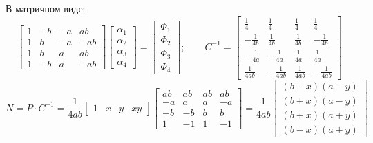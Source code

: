 \documentclass{bmstu}
\begin{document}
		В матричном виде:
		\[
		\begin{bmatrix}
			1 & -b & -a & ab \\
			1 & b & -a &-ab \\
			1 & b & a & ab \\
			1 & -b & a & -ab
		\end{bmatrix}
		\begin{bmatrix}
			\alpha_1 \\ \alpha_2 \\ \alpha_3 \\ \alpha_4 
		\end{bmatrix} = \begin{bmatrix}
		\Phi_1 \\ \Phi_2 \\ \Phi_3 \\ \Phi_4  		
		\end{bmatrix}; \qquad C^{-1}= \begin{bmatrix}
		\frac{1}{4} & \frac{1}{4} & \frac{1}{4} & \frac{1}{4} \\
		-\frac{1}{4b} & \frac{1}{4b} & \frac{1}{4b} & -\frac{1}{4b} \\
		-\frac{1}{4a} & -\frac{1}{4a} & \frac{1}{4a} & \frac{1}{4a} \\
		\frac{1}{4ab} & -\frac{1}{4ab} & \frac{1}{4ab} & -\frac{1}{4ab} 
		\end{bmatrix}
		\]
		\[
	N = P\cdot C^{-1} = \frac{1}{4ab}\begin{bmatrix}
		1 & x & y & xy 
	\end{bmatrix} \begin{bmatrix}
	ab & ab & ab & ab \\
	-a & a & a & -a \\
	-b & -b & b & b \\
	1 & -1 & 1 & -1
	\end{bmatrix} =  \frac{1}{4ab} \begin{bmatrix}
	(b-x)(a-y) \\ (b+x)(a-y) \\ (b+x)(a+y) \\ (b-x)(a+y)
	\end{bmatrix}
		\]
		
\end{document}
